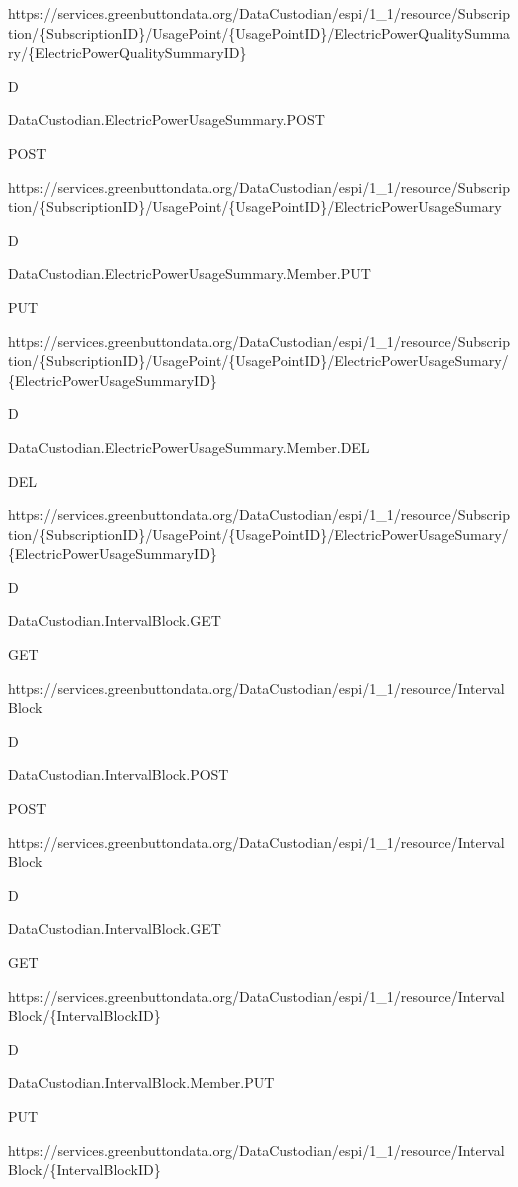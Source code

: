\documentclass[a4paper,12pt,single,pdftex]{scrbook}
\begin{document}
https://services.greenbuttondata.org/DataCustodian/espi/1\_1/resource/Subscription/\{SubscriptionID\}/UsagePoint/\{UsagePointID\}/ElectricPowerQualitySummary/\{ElectricPowerQualitySummaryID\}

D

DataCustodian.ElectricPowerUsageSummary.POST

POST

https://services.greenbuttondata.org/DataCustodian/espi/1\_1/resource/Subscription/\{SubscriptionID\}/UsagePoint/\{UsagePointID\}/ElectricPowerUsageSumary

D

DataCustodian.ElectricPowerUsageSummary.Member.PUT

PUT

https://services.greenbuttondata.org/DataCustodian/espi/1\_1/resource/Subscription/\{SubscriptionID\}/UsagePoint/\{UsagePointID\}/ElectricPowerUsageSumary/\{ElectricPowerUsageSummaryID\}

D

DataCustodian.ElectricPowerUsageSummary.Member.DEL

DEL

https://services.greenbuttondata.org/DataCustodian/espi/1\_1/resource/Subscription/\{SubscriptionID\}/UsagePoint/\{UsagePointID\}/ElectricPowerUsageSumary/\{ElectricPowerUsageSummaryID\}

D

DataCustodian.IntervalBlock.GET

GET

https://services.greenbuttondata.org/DataCustodian/espi/1\_1/resource/IntervalBlock

D

DataCustodian.IntervalBlock.POST

POST

https://services.greenbuttondata.org/DataCustodian/espi/1\_1/resource/IntervalBlock

D

DataCustodian.IntervalBlock.GET

GET

https://services.greenbuttondata.org/DataCustodian/espi/1\_1/resource/IntervalBlock/\{IntervalBlockID\}

D

DataCustodian.IntervalBlock.Member.PUT

PUT

https://services.greenbuttondata.org/DataCustodian/espi/1\_1/resource/IntervalBlock/\{IntervalBlockID\}
\end{document}
